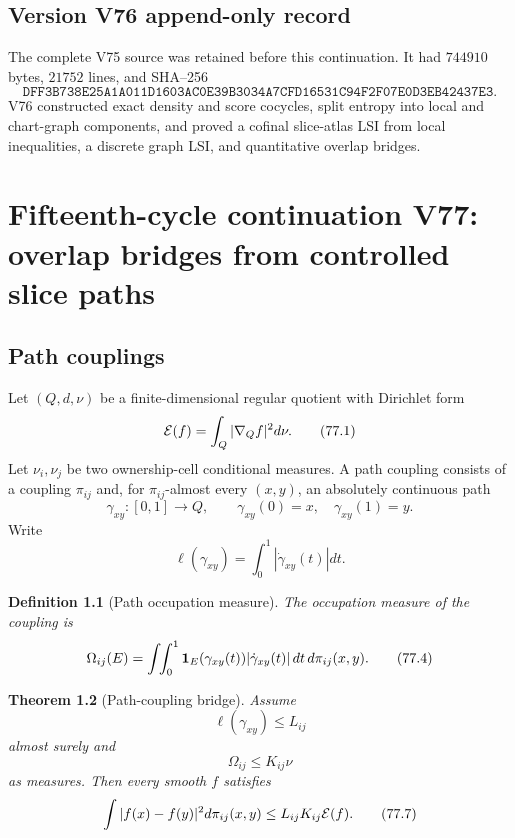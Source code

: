 \documentclass[11pt]{article}
\newtheorem{theorem}{Theorem}[section]
\newtheorem{definition}[theorem]{Definition}
\theoremstyle{remark}
\begin{document}
\section*{Version V76 append-only record}
The complete V75 source was retained before this continuation.  It
had \(744910\) bytes, \(21752\) lines, and SHA--256
\[
 \texttt{DFF3B738E25A1A011D1603AC0E39B3034A7CFD16531C94F2F07E0D3EB42437E3}.
\]
V76 constructed exact density and score cocycles, split entropy
into local and chart-graph components, and proved a cofinal
slice-atlas LSI from local inequalities, a discrete graph LSI, and
quantitative overlap bridges.

\chapter{Fifteenth-cycle continuation V77: overlap bridges from controlled slice paths}
\label{sec:v15v77}

\section{Path couplings}

Let \((Q,d,\nu)\) be a finite-dimensional regular quotient with
Dirichlet form
\[
 {\cal E}(f)=\int_Q|\nabla_Qf|^2d\nu.                 \tag{77.1}
\]
Let \(\nu_i,\nu_j\) be two ownership-cell conditional measures.
A path coupling consists of a coupling \(\pi_{ij}\) and, for
\(\pi_{ij}\)-almost every \((x,y)\), an absolutely continuous path
\[
 \gamma_{xy}:[0,1]\to Q,\qquad
 \gamma_{xy}(0)=x,\quad\gamma_{xy}(1)=y.              \tag{77.2}
\]
Write
\[
 \ell(\gamma_{xy})=\int_0^1|\dot\gamma_{xy}(t)|dt.    \tag{77.3}
\]

\begin{definition}[Path occupation measure]
\label{def:v15v77-occupation}
The occupation measure of the coupling is
\[
 \Omega_{ij}(E)
 =
 \int\!\!\int_0^1
 {\bf1}_E(\gamma_{xy}(t))
 |\dot\gamma_{xy}(t)|\,dt\,d\pi_{ij}(x,y).            \tag{77.4}
\]
\end{definition}

\begin{theorem}[Path-coupling bridge]
\label{thm:v15v77-path}
Assume
\[
 \ell(\gamma_{xy})\leq L_{ij}                         \tag{77.5}
\]
almost surely and
\[
 \Omega_{ij}\leq K_{ij}\nu                            \tag{77.6}
\]
as measures.  Then every smooth \(f\) satisfies
\[
 \int|f(x)-f(y)|^2d\pi_{ij}(x,y)
 \leq
 L_{ij}K_{ij}{\cal E}(f).                             \tag{77.7}
\]
\end{theorem}
\end{document}
